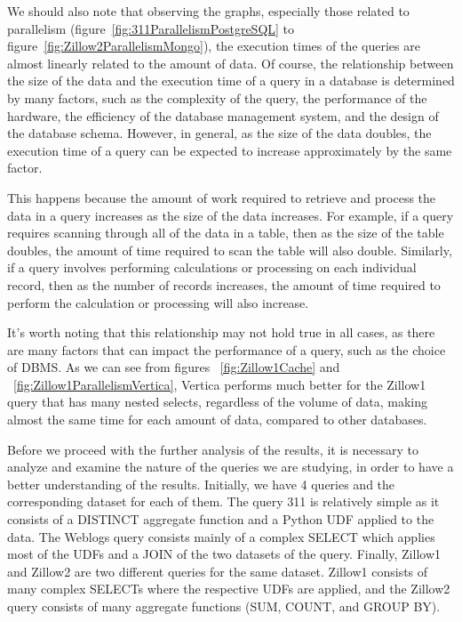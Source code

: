 We should also note that observing the graphs, especially those related to parallelism 
(figure~\ref{fig:311ParallelismPostgreSQL} to figure~\ref{fig:Zillow2ParallelismMongo}), 
the execution times of the queries are almost linearly related to the amount of 
data. Of course, the relationship between the size of the data and the execution time 
of a query in a database is determined by many factors, such as the complexity of the 
query, the performance of the hardware, the efficiency of the database management system, 
and the design of the database schema. However, in general, as the size of the data doubles, 
the execution time of a query can be expected to increase approximately by the same factor.

This happens because the amount of work required to retrieve and process the data in a 
query increases as the size of the data increases. For example, if a query requires 
scanning through all of the data in a table, then as the size of the table doubles, 
the amount of time required to scan the table will also double. Similarly, if a query 
involves performing calculations or processing on each individual record, then as the 
number of records increases, the amount of time required to perform the calculation or 
processing will also increase.

It's worth noting that this relationship may not hold true in all cases, as there are 
many factors that can impact the performance of a query, such as the choice of DBMS. 
As we can see from figures ~\ref{fig:Zillow1Cache} and ~\ref{fig:Zillow1ParallelismVertica}, 
Vertica performs much better for the Zillow1 query that has many nested selects, 
regardless of the volume of data, making almost the same time for each amount of data, 
compared to other databases.


Before we proceed with the further analysis of the results, it is necessary to analyze and 
examine the nature of the queries we are studying, in order to have a better understanding 
of the results. Initially, we have 4 queries and the corresponding dataset for each of them. 
The query 311 is relatively simple as it consists of a DISTINCT aggregate function and a 
Python UDF applied to the data. The Weblogs query consists mainly of a complex SELECT which 
applies most of the UDFs and a JOIN of the two datasets of the query. Finally, Zillow1 and 
Zillow2 are two different queries for the same dataset. Zillow1 consists of many complex SELECTs 
where the respective UDFs are applied, and the Zillow2 query consists of many aggregate 
functions (SUM, COUNT, and GROUP BY).


